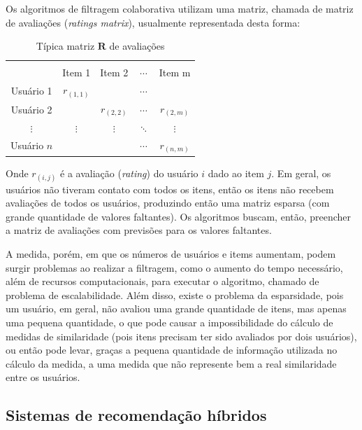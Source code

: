 \documentclass[12pt,a4paper,header]{abnt}
\begin{document}
Os algoritmos de filtragem colaborativa utilizam uma matriz, chamada de matriz de avaliações (\textit{ratings matrix}), usualmente representada desta forma:

\begin{table}[!h]
\centering
\caption{Típica matriz $\mathbf{R}$ de avaliações}
\label{rating_matrix}
\begin{tabular}{c|c|c|c|c}
\hline \\
            & Item 1      & Item 2      & $\cdots$ & Item m      \\
Usuário 1   & $r_{(1, 1)}$ &             & $\cdots$  &             \\
Usuário 2   &  & $r_{(2, 2)}$ & $\cdots$ & $r_{(2, m)}$ \\
$\vdots$       &    $\vdots$  & $\vdots$       &  $\ddots$ & $\vdots$ \\
Usuário $n$ &  &             & $\cdots$ & $r_{(n, m)}$ \\
\hline
\end{tabular}
\end{table}

Onde $r_{(i, j)}$ é a avaliação (\textit{rating}) do usuário $i$ dado ao item $j$. Em geral, os usuários não tiveram contato com todos os itens, então os itens não recebem avaliações de todos os usuários, produzindo então uma matriz esparsa (com grande quantidade de valores faltantes). Os algoritmos buscam, então, preencher a matriz de avaliações com previsões para os valores faltantes.

A medida, porém, em que os números de usuários e items aumentam, podem surgir problemas ao realizar a filtragem, como o aumento do tempo necessário, além de recursos computacionais, para executar o algoritmo, chamado de problema de escalabilidade\cite{dakhel2011new}. Além disso, existe o problema da esparsidade, pois um usuário, em geral, não avaliou uma grande quantidade de itens, mas apenas uma pequena quantidade, o que pode causar a impossibilidade do cálculo de medidas de similaridade (pois itens precisam ter sido avaliados por dois usuários), ou então pode levar, graças a pequena quantidade de informação utilizada no cálculo da medida, a uma medida que não represente bem a real similaridade entre os usuários\cite{dakhel2011new}.

\subsection{Sistemas de recomendação híbridos}
\end{document}

